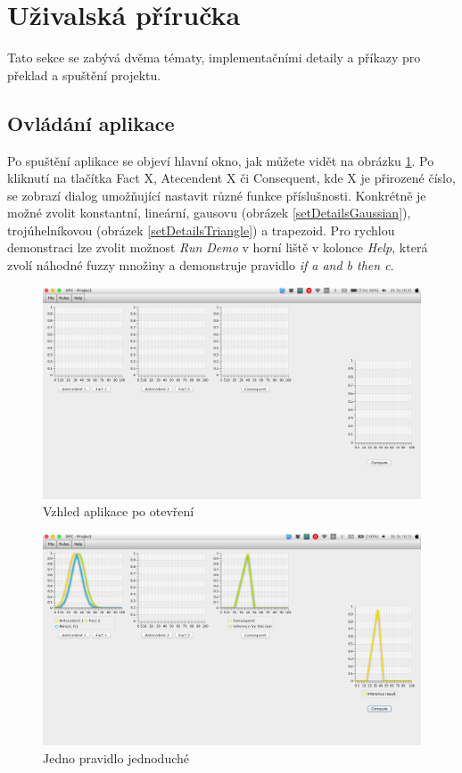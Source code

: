 \documentclass[12pt,a4paper,titlepage]{article}
\begin{document}
\section{Uživalská příručka}
Tato sekce se zabývá dvěma tématy, implementačními detaily a příkazy pro překlad a spuštění projektu.

\subsection{Ovládání aplikace}
Po spuštění aplikace se objeví hlavní okno, jak můžete vidět na obrázku \ref{emptyWindow}. Po kliknutí na tlačítka Fact X, Atecendent X či Consequent, kde X je přirozené číslo, se zobrazí dialog umožňující nastavit různé funkce příslušnosti. Konkrétně je možné zvolit konstantní, lineární, gausovu (obrázek \ref{setDetailsGaussian}), trojúhelníkovou (obrázek \ref{setDetailsTriangle}) a trapezoid. Pro rychlou demonstraci lze zvolit možnost \textit{Run Demo} v horní liště v kolonce \textit{Help}, která zvolí náhodné fuzzy množiny a demonstruje pravidlo \textit{if a and b then c}.

\begin{figure}[!htbp]
	\centering
	\includegraphics[scale=0.3]{emptyWindow}
	\caption{Vzhled aplikace po otevření}
	\label{emptyWindow}
\end{figure}

\begin{figure}[!htbp]
	\centering
	\includegraphics[scale=0.3]{oneRuleSimple}
	\caption{Jedno pravidlo jednoduché}
	\label{oneRuleSimple}
\end{figure}
\end{document}
